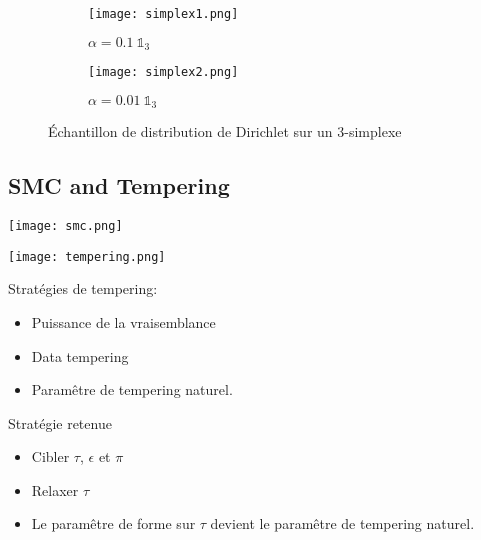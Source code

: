 \documentclass{beamer}
\newcommand{\fr}[1]{#1}
\newcommand{\en}[1]{}
\begin{document}
\begin{frame}
\begin{figure}[H]

     \begin{subfigure}[b]{0.49\textwidth}
\texttt{[image: simplex1.png]}
\caption{$\alpha=0.1~\mathds{1}_3$}
\end{subfigure}%
     \begin{subfigure}[b]{0.49\textwidth}
\texttt{[image: simplex2.png]}
\caption{$\alpha=0.01~\mathds{1}_3$}
     \end{subfigure}
\caption{ \fr{Échantillon de distribution de Dirichlet sur un 3-simplexe} \en{Dirichlet sample on the 3-simplex}}
\end{figure}
\end{frame}

\subsection{SMC and Tempering}

\begin{frame}[fragile]
\texttt{[image: smc.png]}
%
\end{frame}


\begin{frame}[fragile]
\texttt{[image: tempering.png]}
%
\end{frame}

\begin{frame}
Stratégies de tempering:
\begin{itemize}
\item Puissance de la vraisemblance
\item Data tempering
\item Paramêtre de tempering naturel.
\end{itemize}
\end{frame}

\begin{frame}
Stratégie retenue
\begin{itemize}
\item Cibler $\tau$, $\epsilon$ et $\pi$
\item Relaxer $\tau$
\item Le paramêtre de forme sur $\tau$ devient le paramêtre de tempering naturel.
\end{itemize}
\end{frame}
\end{document}
